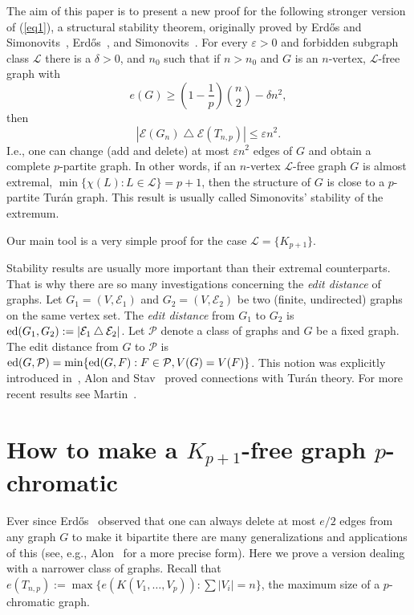 \documentclass[11pt]{article}
\def\EE{{\mathcal E}}
\def\ed{{\rm ed}}
\def\LL{{\mathcal L}}
\def\PP{{\mathcal P}}
\begin{document}
The aim of this paper is to present a new proof for the following stronger version of (\ref{eq1}), a structural stability theorem,
 originally proved by Erd\H os and  Simonovits~\cite{ErdSimLim}, Erd\H os~\cite{Erd_Rome,Erd_Tihany}, and Simonovits~\cite{Sim_Tihany}.
For every $\varepsilon>0$ and forbidden subgraph class $\LL$ there is a $\delta>0$, and $n_0$ such that
 if  $n>n_0$ and $G$ is an $n$-vertex, $\LL$-free graph with
\begin{equation*}%
 e(G)\ge\left(1-\frac{1}{p}\right)\binom{n}{2}-\delta n^2,
   \end{equation*}
then
\begin{equation}\label{eq2}
|\EE(G_n) \bigtriangleup \EE(T_{n,p})|\le \varepsilon n^2.
 \end{equation}
I.e., one can change (add and delete) at most $\varepsilon n^2$ edges of $G$
 and obtain a complete $p$-partite graph.
In other words, if an $n$-vertex $\LL$-free graph $G$ is almost extremal,
$\min \{ \chi(L): L\in \LL\}=p+1$, then the structure of $G$ is close to a $p$-partite Tur\'an graph.
This result is usually called Simonovits' stability of the extremum.

Our main tool is a very simple proof for the case $\LL=\{K_{p+1}\}$.

Stability results are usually  more important than their extremal counterparts.
That is why there are so many investigations concerning the {\it edit distance} of graphs.
Let $G_1=(V,\EE_1)$ and $G_2=(V,\EE_2)$ be two (finite, undirected) graphs on the same vertex set.
The {\it edit distance} from $G_1$ to $G_2$ is $\ed(G_1,G_2):=|\EE_1 \bigtriangleup  \EE_2|$.
Let $\PP$ denote a class of graphs and $G$ be a fixed graph.
The edit distance from $G$ to $\PP$ is $\ed(G,\PP)=\min\{\ed(G,F):F\in \PP,V(G)=V(F)\}$.
This notion was explicitly introduced in~\cite{AxeMartin2006}, Alon and Stav~\cite{AloSta} proved connections with Tur\'an theory.
For more recent results see Martin~\cite{Martin2015}.





\section{How to make a $K_{p+1}$-free graph $p$-chromatic}

Ever since Erd\H os~\cite{ErdBipartite} observed that one can always delete at most $e/2$ edges from any graph $G$
 to make it bipartite there are many generalizations and applications of this
(see, e.g., Alon~\cite{Alo} for a more precise form).
Here we prove a version dealing with a narrower class of graphs.
Recall that $e(T_{n,p}):= \max\{ e(K(V_1, \dots, V_p)): \sum |V_i|=n\}$, the maximum size of a $p$-chromatic graph.
\end{document}
